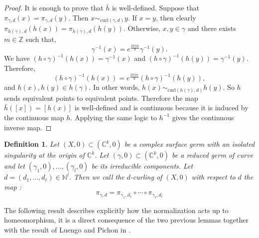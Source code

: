\documentclass[reqno,dvipsnames,12pt]{amsart}
\newtheorem{defi}[thm]{Definition}
\begin{document}
\begin{proof}
 It is enough to prove that $\bar h$ is well-defined. Suppose that $\pi_{\gamma,d}(x)=\pi_{\gamma,d}(y)$. Then $x\sim_{\mathrm{curl}(\gamma,d)}y$. If $x=y$, then clearly $\pi_{h(\gamma),d}(h(x)) = \pi_{h(\gamma),d}(h(y))$. Otherwise, $x,y\in\gamma$ and there exists $m \in \mathbb{Z}$ such that, $$\gamma^{-1}(x)=e^{\frac{2\pi i m}{d}}\gamma^{-1}(y).$$ We have $(h\circ\gamma)^{-1}(h(x))=\gamma^{-1}(x)$ and $(h\circ\gamma)^{-1}(h(y))=\gamma^{-1}(y)$. Therefore,
\[
(h\circ\gamma)^{-1}(h(x))=e^{\frac{2\pi i m}{d}}(h\circ\gamma)^{-1}(h(y)),
\]
and $h(x),h(y)\in h(\gamma)$. In other words, $h(x)\sim_{\mathrm{curl}(h(\gamma),d)} h(y).$ So $h$ sends equivalent points to equivalent points. Therefore the map $\bar h([x])=[h(x)]$ is well-defined and is continuous because it is induced by the continuous map
$h$. Applying the same logic to $h^{-1}$ gives the continuous inverse map.
\end{proof}

\begin{defi}
Let $(X,0)\subset(\mathbb{C}^k,0)$ be a  complex
surface germ with an isolated singularity at the origin of $\mathbb{C}^k$.
Let $(\gamma,0)\subset(\mathbb{C}^k,0)$ be a reduced germ of curve and let
$(\gamma_1,0),\ldots,(\gamma_l,0)$ be its irreducible components. Let $d=(d_1,\ldots,d_{\ell})\in\mathbb{N}^l$.
Then we call the $d$-curling of $(X,0)$ with respect to $d$ the map  :$$\pi_{\gamma,d}
=
\pi_{\gamma_1,d_1}
\circ\cdots\circ
\pi_{\gamma_{\ell},d_{\ell}}$$
\end{defi}

The following result describes explicitly how the normalization acts
up to homeomorphism, it is a direct consequence of the two previous lemmas together with
the result of Luengo and Pichon in \cite{luengopichon}.
\end{document}

